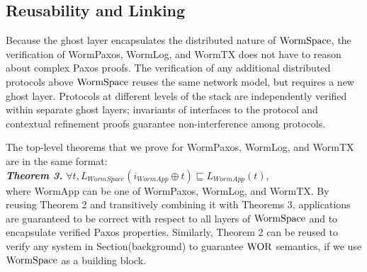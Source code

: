 

\subsection{Reusability and Linking}
\label{subsec:proof_effort}

Because the ghost layer encapsulates the distributed nature of $\mathrm{WormSpace}$, the verification of WormPaxos, WormLog, and WormTX does not have to reason about complex Paxos proofs. %
The verification of any additional distributed protocols above $\mathrm{WormSpace}$ reuses the same network model, but requires a new ghost layer. Protocols at different levels of the stack are independently verified within separate ghost layers; invariants of interfaces to the protocol and contextual refinement proofs guarantee non-interference among protocols. 

The top-level theorems that we prove for WormPaxos, WormLog, and WormTX are in the same format:\\
\textit{\textbf{Theorem 3.} $\forall t, L_{WormSpace} (i_{WormApp} \oplus t) \sqsubseteq L_{WormApp} (t)$},\\
where WormApp can be one of WormPaxos, WormLog, and WormTX.
By reusing Theorem 2 and transitively combining it with Theorems 3, applications are guaranteed to be correct with respect to all layers of $\mathrm{WormSpace}$ and to encapsulate verified Paxos properties. Similarly, Theorem 2 can be reused to verify any system in Section(background) to guarantee $\mathrm{WOR}$ semantics, if we use $\mathrm{WormSpace}$ as a building block. 


